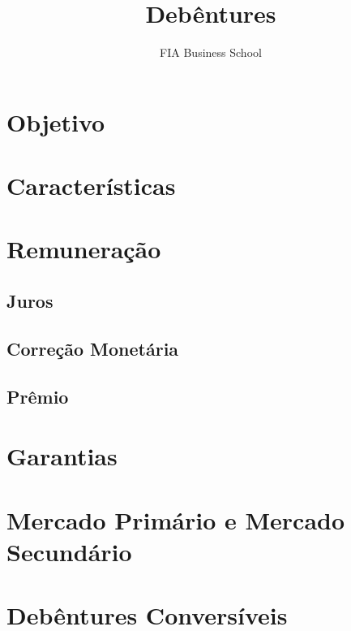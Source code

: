 \documentclass{article}\usepackage[]{graphicx}\usepackage[]{xcolor}
\title{Debêntures}
\author{FIA Business School}
\begin{document}
\maketitle

\section*{Objetivo}

\section*{Características}

\section*{Remuneração}

\subsection*{Juros}

\subsection*{Correção Monetária}

\subsection*{Prêmio}

\section*{Garantias}

\section*{Mercado Primário e Mercado Secundário}

\section*{Debêntures Conversíveis}
\end{document}
